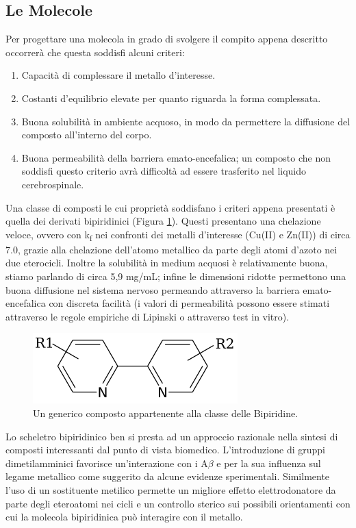 \documentclass[a4paper, 12pt]{article}
\begin{document}
\subsection{Le Molecole}
\label{sec:bpy_mol}
Per progettare una molecola in grado di svolgere il compito appena descritto occorrerà che questa soddisfi alcuni criteri:
\begin{enumerate}
	\item Capacità di complessare il metallo d'interesse.
	\item Costanti d'equilibrio elevate per quanto riguarda la forma complessata.
	\item Buona solubilità in ambiente acquoso, in modo da permettere la diffusione del composto all'interno del corpo.
	\item Buona permeabilità della barriera emato-encefalica; un composto che non soddisfi questo criterio avrà difficoltà ad essere trasferito nel liquido cerebrospinale.
\end{enumerate}
Una classe di composti le cui proprietà soddisfano i criteri appena presentati è quella dei derivati bipiridinici (Figura \ref{fig:bpy}).
Questi presentano una chelazione veloce, ovvero con k\textsubscript{f} nei confronti dei metalli d'interesse (Cu(II) e Zn(II)) di circa 7.0, grazie alla chelazione dell'atomo metallico da parte degli atomi d'azoto nei due eterocicli. Inoltre la solubilità in medium acquosi è relativamente buona, stiamo parlando di circa 5,9 mg/mL; infine le dimensioni ridotte permettono una buona diffusione nel sistema nervoso permeando attraverso la barriera emato-encefalica con discreta facilità (i valori di permeabilità possono essere stimati attraverso le regole empiriche di Lipinski o attraverso test in vitro). \autocite{di_high_2003}
\begin{figure}[H]
	\centering
	\includegraphics[width=.5\linewidth]{immagini/bpy.png}
	\caption{Un generico composto appartenente alla classe delle Bipiridine.}
	\label{fig:bpy}
\end{figure}
Lo scheletro bipiridinico ben si presta ad un approccio razionale nella sintesi di composti interessanti dal punto di vista biomedico.
L'introduzione di gruppi dimetilamminici favorisce un'interazione con i A\(\beta\) e per la sua influenza sul legame metallico come suggerito da alcune evidenze sperimentali. Similmente l'uso di un sostituente metilico permette un migliore effetto elettrodonatore da parte degli eteroatomi nei cicli e un controllo sterico sui possibili orientamenti con cui la molecola bipiridinica può interagire con il metallo. \autocite{derrick_importance_2016,savelieff_ongoing_2014}
\end{document}
